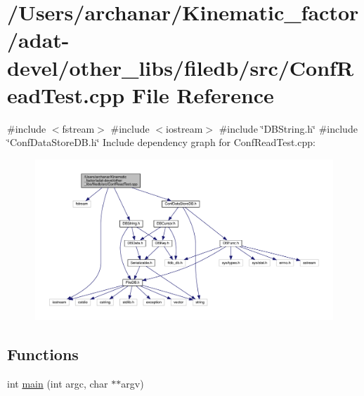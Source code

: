 \hypertarget{adat-devel_2other__libs_2filedb_2src_2ConfReadTest_8cpp}{}\section{/\+Users/archanar/\+Kinematic\+\_\+factor/adat-\/devel/other\+\_\+libs/filedb/src/\+Conf\+Read\+Test.cpp File Reference}
\label{adat-devel_2other__libs_2filedb_2src_2ConfReadTest_8cpp}
{\ttfamily \#include $<$fstream$>$}\newline
{\ttfamily \#include $<$iostream$>$}\newline
{\ttfamily \#include \char`\"{}D\+B\+String.\+h\char`\"{}}\newline
{\ttfamily \#include \char`\"{}Conf\+Data\+Store\+D\+B.\+h\char`\"{}}\newline
Include dependency graph for Conf\+Read\+Test.\+cpp\+:
\nopagebreak
\begin{figure}[H]
\begin{center}
\leavevmode
\includegraphics[width=350pt]{d0/d22/adat-devel_2other__libs_2filedb_2src_2ConfReadTest_8cpp__incl}
\end{center}
\end{figure}
\subsection*{Functions}
\begin{DoxyCompactItemize}
\item 
int \mbox{\hyperlink{adat-devel_2other__libs_2filedb_2src_2ConfReadTest_8cpp_a3c04138a5bfe5d72780bb7e82a18e627}{main}} (int argc, char $\ast$$\ast$argv)
\end{DoxyCompactItemize}


